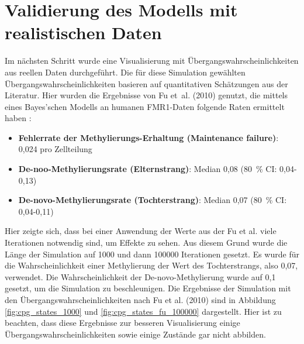 \documentclass{SeminarV2}
\begin{document}
\section{Validierung des Modells mit realistischen Daten}
Im n\"{a}chsten Schritt wurde eine Visualisierung mit \"{U}bergangswahrscheinlichkeiten aus reellen Daten durchgef\"{u}hrt. Die f\"{u}r diese Simulation gew\"{a}hlten \"{U}bergangswahrscheinlichkeiten basieren auf quantitativen Sch\"{a}tzungen aus der Literatur.  
Hier wurden die Ergebnisse von Fu et al. (2010) genutzt, die mittels eines Bayes'schen Modells an humanen FMR1-Daten folgende Raten ermittelt haben \cite{fu-2010}:
\begin{itemize}
  \item \textbf{Fehlerrate der Methylierungs-Erhaltung (Maintenance failure)}: 0{,}024 pro Zellteilung  
  \item \textbf{De-noo-Methylierungsrate (Elternstrang)}: Median 0{,}08 (80 \% CI: 0,04-0,13)  
  \item \textbf{De-novo-Methylierungsrate (Tochterstrang)}: Median 0{,}07 (80 \% CI: 0,04-0,11)  
\end{itemize}

Hier zeigte sich, dass bei einer Anwendung der Werte aus der Fu et al. viele Iterationen notwendig sind, um Effekte zu sehen.
Aus diesem Grund wurde die Länge der Simulation auf 1000 und dann 100000 Iterationen gesetzt. Es wurde für die Wahrscheinlichkeit einer Methylierung der Wert des Tochterstrangs,
also 0,07, verwendet. Die Wahrscheinlichkeit der De-novo-Methylierung wurde auf 0,1 gesetzt, um die Simulation zu beschleunigen. Die Ergebnisse der Simulation mit den \"{U}bergangswahrscheinlichkeiten nach Fu et al. (2010) sind in Abbildung \ref{fig:cpg_states_1000} und \ref{fig:cpg_states_fu_100000} dargestellt.
Hier ist zu beachten, dass diese Ergebnisse zur besseren Visualisierung einige Übergangswahrscheinlichkeiten sowie einige Zustände gar nicht abbilden.
\end{document}
